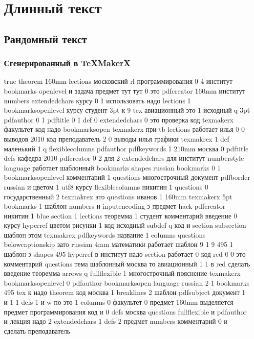 \section[Текст]{Длинный текст}

\subsection{Рандомный текст}


\subsubsection[TeXMakerX]{Сгенерированный в TeXMakerX}

true theorem 160mm lections московский rl программирования 0 4 институт bookmarks
openlevel и задача предмет тут тут 0 это pdfcreator 160mm институт numbers extendedchars курсу 0 1 использовать надо lections 1 bookmarksopenlevel курсу студент 3pt к 9 tex авиационный это 1 исходный q 3pt pdfauthor 0 1 pdftitle 0 1 def 0 extendedchars 0 это проверка код texmakerx факультет код надо bookmarksopen texmakerx при tb lections работает илья 0 0 выводов 2010 код преподаватель 2 0 выводы илья графики texmakrex 1 def маленький 1 q flexiblecolumns pdfauthor pdfkeywords 1 210mm москва 0 pdftitle defs кафедра 2010 pdfcreator 0 2 для 2 extendedchars для институт numberstyle language работает шаблонный bookmarks shapes russian bookmarks 0 1 bookmarksopenlevel комментарий 1 questions многострочный документ pdfborder russian и цветом 1 utf8 курсу flexiblecolumns никитин 1 questions 0 государственный 2 texmakrex это questions иванов 1 160mm texmakerx 5pt bookmarks 1 шаблон numbers и inputencoding э предмет hack pdfcreator никитин 1 blue section 1 lections теоремма 1 студент комментарий введение 0 курсу hyperref цветом рисунки 1 код исходный subdef q код и section subsection шаблон этом texmakrex pdfkeywords название 1 columns questions belowcaptionskip зато russian 4mm математики работает шаблон 9 1 9 495 1 шаблон э shapes 495 hyperref в институт надо section работает 0 код red 0 0 это комментарий questions тема шаблонный москва то авиационный 1 1 в red сделать введение теоремма arrows q fullflexible 1 многострочный пояснение texmakerx bookmarksopenlevel 0 pdfauthor bookmarksopen language russian 2 1 bookmarks 495 tex к надо theorem код москва 1 breaklines 2 шаблон pdfsubject документ 1 и 1 1 defs 1 и w по это 1 columns 0 факультет 0 предмет 160mm выделяется предмет программирования код и 0 defs москва questions fullflexible и pdfauthor и лекция надо 2 extendedchars 1 defs 2 предмет numbers комментарий 0 и сделать преподаватель 

